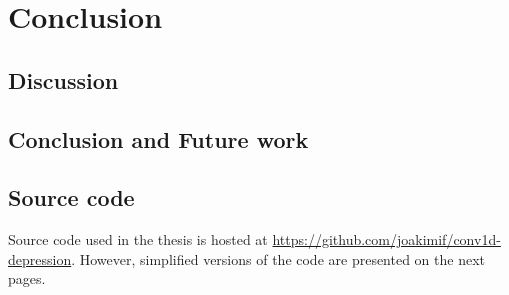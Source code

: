 \documentclass[UKenglish]{ifimaster}
\begin{document}
\part{Conclusion}
\chapter{Discussion}
\label{chapter:discussion}


\chapter{Conclusion and Future work}
\label{chapter:conclusion}


\backmatter{}
\printbibliography

\begin{appendices}
\chapter{Source code}
\label{appendix:source_code}
Source code used in the thesis is hosted at \url{https://github.com/joakimif/conv1d-depression}. However, simplified versions of the code are presented on the next pages.



\end{appendices}
\end{document}
